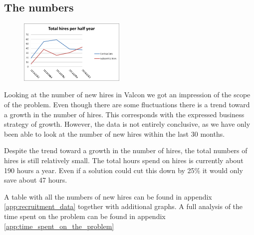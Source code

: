 \subsection{The numbers}
\begin{figure}
\vspace{-20pt}
\centering
\includegraphics[width=0.45\textwidth]{appendix/total_hires_per_half_year.png}
\label{fig:total_hires_per_half_year}
\end{figure}
Looking at the number of new hires in Valcon we got an impression of the scope of the problem.
Even though there are some fluctuations there is a trend toward a growth in the number of hires.
This corresponds with the expressed business strategy of growth.
However, the data is not entirely conclusive, as we have only been able to look at the number of new hires within the last 30 months.

Despite the trend toward a growth in the number of hires, the total numbers of hires is still relatively small.
The total hours spend on hires is currently about 190 hours a year.
Even if a solution could cut this down by 25\% it would only save about 47 hours.

A table with all the numbers of new hires can be found in appendix \ref{app:recruitment_data} together with additional graphs.
A full analysis of the time spent on the problem can be found in appendix \ref{app:time_spent_on_the_problem}
